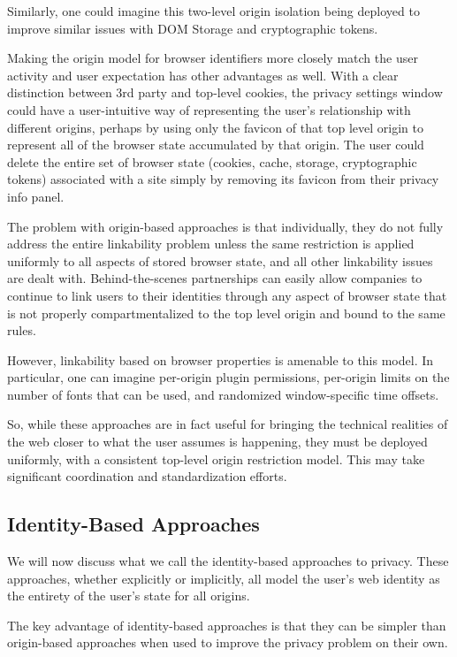 \documentclass[letterpaper,11pt]{llncs}
\begin{document}
Similarly, one could imagine this two-level origin isolation being deployed to
improve similar issues with DOM Storage and cryptographic tokens.

Making the origin model for browser identifiers more closely match the user
activity and user expectation has other advantages as well. With a clear
distinction between 3rd party and top-level cookies, the privacy settings
window could have a user-intuitive way of representing the user's relationship
with different origins, perhaps by using only the favicon of that top level
origin to represent all of the browser state accumulated by that origin. The
user could delete the entire set of browser state (cookies, cache, storage,
cryptographic tokens) associated with a site simply by removing its favicon
from their privacy info panel.

The problem with origin-based approaches is that individually, they do not
fully address the entire linkability problem unless the same restriction is
applied uniformly to all aspects of stored browser state, and all other
linkability issues are dealt with. Behind-the-scenes partnerships can easily
allow companies to continue to link users to their identities through any
aspect of browser state that is not properly compartmentalized to the top
level origin and bound to the same rules.

However, linkability based on browser properties is amenable to this
model. In particular, one can imagine per-origin plugin permissions,
per-origin limits on the number of fonts that can be used, and randomized
window-specific time offsets.

So, while these approaches are in fact useful for bringing the technical
realities of the web closer to what the user assumes is happening, they must
be deployed uniformly, with a consistent top-level origin restriction model.
This may take significant coordination and standardization efforts.

\subsection{Identity-Based Approaches}

We will now discuss what we call the identity-based approaches to privacy.
These approaches, whether explicitly or implicitly, all model the user's web
identity as the entirety of the user's state for all origins.

The key advantage of identity-based approaches is that they can be simpler
than origin-based approaches when used to improve the privacy problem on their
own.
\end{document}
